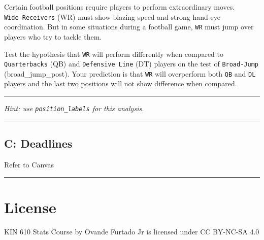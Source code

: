 \documentclass[
]{article}
\begin{document}
Certain football positions require players to perform extraordinary moves. \texttt{Wide\ Receivers} (WR) must show blazing speed and strong hand-eye coordination. But in some situations during a football game, \texttt{WR} must jump over players who try to tackle them.

Test the hypothesis that \texttt{WR} will perform differently when compared to \texttt{Quarterbacks} (QB) and \texttt{Defensive\ Line} (DT) players on the test of \texttt{Broad-Jump} (broad\_jump\_post). Your prediction is that \texttt{WR} will overperform both \texttt{QB} and \texttt{DL} players and the last two positions will not show difference when compared.

\begin{center}\rule{0.5\linewidth}{0.5pt}\end{center}

\emph{Hint: use \texttt{position\_labels} for this analysis.}

\begin{center}\rule{0.5\linewidth}{0.5pt}\end{center}

\hypertarget{deadlines}{%
\subsection{C: Deadlines}\label{deadlines}}

Refer to Canvas

\begin{center}\rule{0.5\linewidth}{0.5pt}\end{center}

\hypertarget{license}{%
\section{License}\label{license}}

KIN 610 Stats Course by Ovande Furtado Jr is licensed under CC BY-NC-SA 4.0
\end{document}
